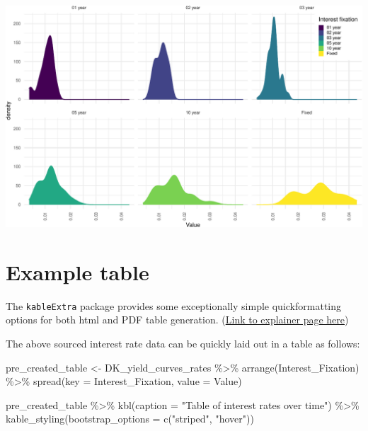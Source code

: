 \documentclass[
]{book}
\newenvironment{Shaded}{\begin{snugshade}}{\end{snugshade}}
\newcommand{\AttributeTok}[1]{\textcolor[rgb]{0.77,0.63,0.00}{#1}}
\newcommand{\FunctionTok}[1]{\textcolor[rgb]{0.00,0.00,0.00}{#1}}
\newcommand{\NormalTok}[1]{#1}
\newcommand{\OtherTok}[1]{\textcolor[rgb]{0.56,0.35,0.01}{#1}}
\newcommand{\SpecialCharTok}[1]{\textcolor[rgb]{0.00,0.00,0.00}{#1}}
\newcommand{\StringTok}[1]{\textcolor[rgb]{0.31,0.60,0.02}{#1}}
\begin{document}
\includegraphics{figures/unnamed-chunk-5-1.pdf}
\newpage

\hypertarget{example-table}{%
\section{Example table}\label{example-table}}

The \texttt{kableExtra} package provides some exceptionally simple quickformatting options for both html and PDF table generation. (\href{https://cran.r-project.org/web/packages/kableExtra/vignettes/awesome_table_in_html.html\#Overview}{Link to explainer page here})

The above sourced interest rate data can be quickly laid out in a table as follows:

\begin{Shaded}
\begin{Highlighting}[]
\NormalTok{pre\_created\_table }\OtherTok{\textless{}{-}}\NormalTok{ DK\_yield\_curves\_rates }\SpecialCharTok{\%\textgreater{}\%}
          \FunctionTok{arrange}\NormalTok{(Interest\_Fixation) }\SpecialCharTok{\%\textgreater{}\%}
          \FunctionTok{spread}\NormalTok{(}\AttributeTok{key =}\NormalTok{ Interest\_Fixation, }\AttributeTok{value =}\NormalTok{ Value)}

\NormalTok{pre\_created\_table }\SpecialCharTok{\%\textgreater{}\%}
  \FunctionTok{kbl}\NormalTok{(}\AttributeTok{caption =} \StringTok{"Table of interest rates over time"}\NormalTok{) }\SpecialCharTok{\%\textgreater{}\%}
  \FunctionTok{kable\_styling}\NormalTok{(}\AttributeTok{bootstrap\_options =} \FunctionTok{c}\NormalTok{(}\StringTok{"striped"}\NormalTok{, }\StringTok{"hover"}\NormalTok{))}
\end{Highlighting}
\end{Shaded}
\end{document}
